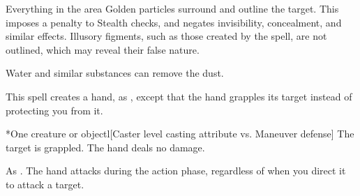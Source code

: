 \begin{spellheader}
    \spelldur{\durshort}
\end{spellheader}
\begin{spelleffects}
    \begin{spelltarget}{Everything in the area}
        \spelleffect Golden particles surround and outline the target. This imposes a  penalty to Stealth checks, and negates invisibility, concealment, and similar effects. Illusory figments, such as those created by the  spell, are not outlined, which may reveal their false nature.
    \end{spelltarget}
\end{spelleffects}
\begin{spellfooter}
    \spellnotes Water and similar substances can remove the dust.
\end{spellfooter}

\begin{spellheader}
    \spellrng{\rngmed}
    \spelldur{\durshort \dismissable}
\end{spellheader}
\begin{spelleffects}
    \spelleffect This spell creates a hand, as , except that the hand grapples its target instead of protecting you from it.
    \begin{spelltarget}*{One creature or object}l[Caster level \add casting attribute vs. Maneuver defense]
        \spellsuccess The target is grappled. The hand deals no damage.
    \end{spelltarget}
\end{spelleffects}
\begin{spellfooter}
    \spellnotes As . The hand attacks during the action phase, regardless of when you direct it to attack a target.
\end{spellfooter}

